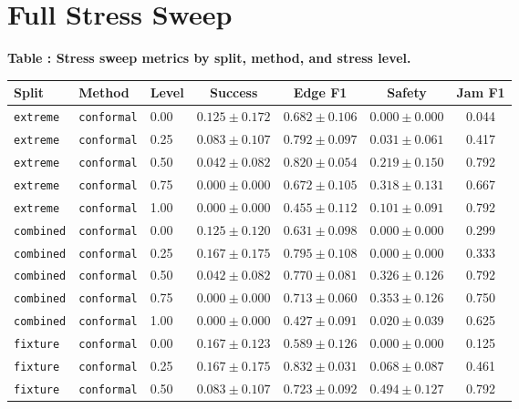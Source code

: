 \documentclass{article}
\begin{document}
\section{Full Stress Sweep}
\tiny
\begin{center}
\label{tab:stressfull}\textbf{Table \thetable: Stress sweep metrics by split, method, and stress level.}\\[0.4ex]
\begin{tabular}{lllcccc}
\toprule
Split & Method & Level & Success & Edge F1 & Safety & Jam F1 \\
\midrule
\texttt{extreme} & \texttt{conformal} & 0.00 & $0.125 \pm 0.172$ & $0.682 \pm 0.106$ & $0.000 \pm 0.000$ & 0.044 \\
\texttt{extreme} & \texttt{conformal} & 0.25 & $0.083 \pm 0.107$ & $0.792 \pm 0.097$ & $0.031 \pm 0.061$ & 0.417 \\
\texttt{extreme} & \texttt{conformal} & 0.50 & $0.042 \pm 0.082$ & $0.820 \pm 0.054$ & $0.219 \pm 0.150$ & 0.792 \\
\texttt{extreme} & \texttt{conformal} & 0.75 & $0.000 \pm 0.000$ & $0.672 \pm 0.105$ & $0.318 \pm 0.131$ & 0.667 \\
\texttt{extreme} & \texttt{conformal} & 1.00 & $0.000 \pm 0.000$ & $0.455 \pm 0.112$ & $0.101 \pm 0.091$ & 0.792 \\
\texttt{combined} & \texttt{conformal} & 0.00 & $0.125 \pm 0.120$ & $0.631 \pm 0.098$ & $0.000 \pm 0.000$ & 0.299 \\
\texttt{combined} & \texttt{conformal} & 0.25 & $0.167 \pm 0.175$ & $0.795 \pm 0.108$ & $0.000 \pm 0.000$ & 0.333 \\
\texttt{combined} & \texttt{conformal} & 0.50 & $0.042 \pm 0.082$ & $0.770 \pm 0.081$ & $0.326 \pm 0.126$ & 0.792 \\
\texttt{combined} & \texttt{conformal} & 0.75 & $0.000 \pm 0.000$ & $0.713 \pm 0.060$ & $0.353 \pm 0.126$ & 0.750 \\
\texttt{combined} & \texttt{conformal} & 1.00 & $0.000 \pm 0.000$ & $0.427 \pm 0.091$ & $0.020 \pm 0.039$ & 0.625 \\
\texttt{fixture} & \texttt{conformal} & 0.00 & $0.167 \pm 0.123$ & $0.589 \pm 0.126$ & $0.000 \pm 0.000$ & 0.125 \\
\texttt{fixture} & \texttt{conformal} & 0.25 & $0.167 \pm 0.175$ & $0.832 \pm 0.031$ & $0.068 \pm 0.087$ & 0.461 \\
\texttt{fixture} & \texttt{conformal} & 0.50 & $0.083 \pm 0.107$ & $0.723 \pm 0.092$ & $0.494 \pm 0.127$ & 0.792 \\

\end{tabular}
\end{center}
\end{document}
